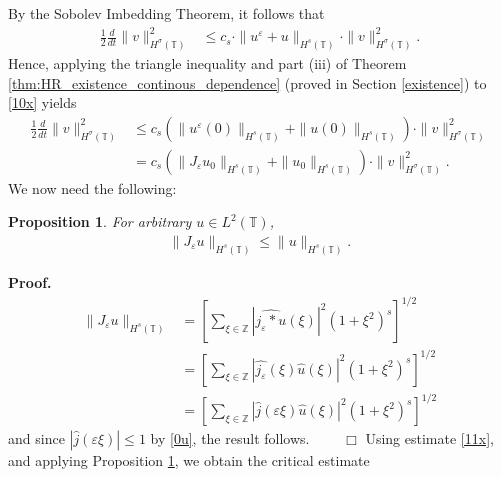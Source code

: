 \documentclass[12pt,reqno]{amsart}
\newcommand{\zz}{\mathbb{Z}}
\newcommand{\ci}{\mathbb{T}}
\newcommand{\ee}{\varepsilon}
\theoremstyle{plain}  %
\newtheorem{proposition}{Proposition}
\theoremstyle{definition}
\begin{document}
\begin{appendices}
\medskip
By the Sobolev Imbedding Theorem, it follows that 
\begin{equation}
	\begin{split}
		\frac{1}{2}\frac{d}{dt} \|v\|_{H^{\sigma}(\ci)}^2
		& \le
		c_s \cdot \|u^{\ee}
		+ u\|_{H^{s}(\ci)}\cdot \|v\|_{H^{\sigma}(\ci)}^2.
		\label{10x}
	\end{split}
\end{equation}
Hence, applying the triangle inequality and
part (iii) of Theorem \ref{thm:HR_existence_continous_dependence} (proved
in Section \ref{existence}) to \eqref{10x} yields
%
\begin{equation}
	\begin{split}
		\label{11x}
		\frac{1}{2}\frac{d}{dt} \|v\|_{H^{\sigma}(\ci)}^2
		& \le
		c_s (\|u^{\ee}(0)\|_{H^{s}(\ci)}
		+ \|u(0)\|_{H^{s}(\ci)})\cdot \|v\|_{H^{\sigma}(\ci)}^2
		\\
		& = c_s (\|J_\ee u_0\|_{H^{s}(\ci)}
		+ \|u_0\|_{H^{s}(\ci)})\cdot \|v\|_{H^{\sigma}(\ci)}^2.
	\end{split}
\end{equation}
We now need the following:
\begin{proposition}
	\label{lem3r}
	For arbitrary $u \in L^2(\ci)$,
	\begin{equation}
		\begin{split}
			\|J_\ee u\|_{H^s(\ci)} \le \|u\|_{H^s(\ci)}.
			\label{lem100u}
		\end{split}
	\end{equation}
\end{proposition}
%
%
%
%
{\bf Proof.}
\begin{equation*}
	\begin{split}
		\|J_\ee u\|_{H^s(\ci)} 
		& = \left[\sum_{\xi \in \zz} |\widehat{j_\ee * u}(\xi) |^2
		(1+\xi^2)^s \right ]^{1/2}
		\\
		& = \left [ \sum_{\xi \in \zz} |\widehat{j_\ee} (\xi) \widehat{u}(\xi) |^2
		(1+ \xi^2)^s \right ]^{1/2}
		\\
		& = \left [ \sum_{\xi \in \zz} |\widehat{j}(\ee \xi)
		\widehat{u}(\xi)|^2 ( 1+ \xi^2)^s \right ]^{1/2}
	\end{split}
\end{equation*}
and since $|\widehat{j }(\ee \xi) | \le 1$ by \eqref{0u}, the result
follows. $\qquad \Box$
\vskip0.1in
Using estimate \eqref{11x}, and applying Proposition \ref{lem3r}, 
we obtain the critical estimate 
\begin{equation}
	\begin{split}
		\label{12x}

\end{split}
\end{equation}
\end{appendices}
\end{document}
